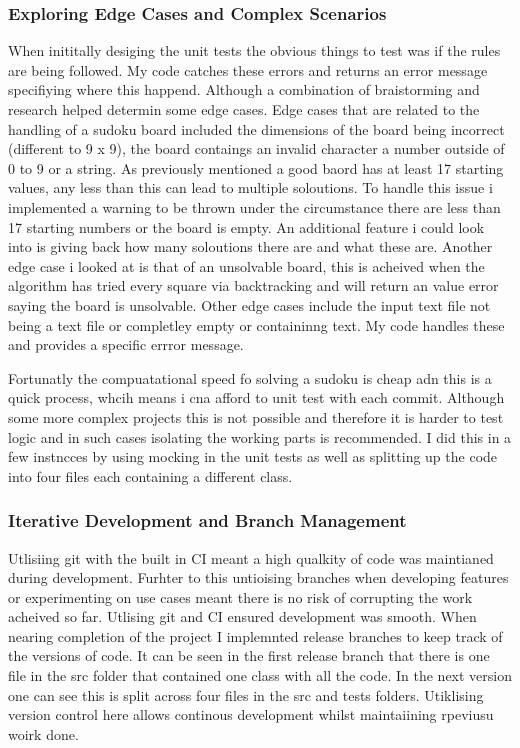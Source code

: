 \documentclass{report}
\begin{document}
\subsubsection*{Exploring Edge Cases and Complex Scenarios}
When inititally desiging the unit tests the obvious things to test was if the rules are being followed. My code catches these errors and returns an error message specifiying where this happend.
Although a combination of braistorming and research \cite{3} helped determin some edge cases.
Edge cases that are related to the handling of a sudoku board included the dimensions of the board being incorrect (different to 9 x 9),
the board contaings an invalid character a number outside of 0 to 9 or a string.
As previously mentioned a good baord has at least 17 starting values, any less than this can lead to multiple soloutions.
To handle this issue i implemented a warning to be thrown under the circumstance there are less than 17 starting numbers or the board is empty.
An additional feature i could look into is giving back how many soloutions there are and what these are.
Another edge case i looked at is that of an unsolvable board, this is acheived when the algorithm has tried every square via backtracking and will return an value error saying the board is unsolvable.
Other edge cases include the input text file not being a text file or completley empty or containinng text. My code handles these and provides a specific errror message.

Fortunatly the compuatational speed fo solving a sudoku is cheap adn this is a quick process, whcih means i cna afford to unit test with each commit.
Although some more complex projects this is not possible and therefore it is harder to test logic and in such cases isolating the working parts is recommended.
I did this in a few instncces by using mocking in the unit tests as well as splitting up the code into four files each containing a different class.

\subsubsection*{Iterative Development and Branch Management}
Utlisiing git with the built in CI meant a high qualkity of code was maintianed during development.
Furhter to this untioising branches when developing features or experimenting on use cases meant there is no risk of corrupting the work acheived so far.
Utlising git and CI ensured development was smooth. When nearing completion of the project I implemnted release branches to keep track of the versions of code.
It can be seen in the first release branch that there is one file in the src folder that contained one class with all the code.
In the next version one can see this is split across four files in the src and tests folders. Utiklising version control here allows continous development whilst maintaiining rpeviusu woirk done.
\end{document}
